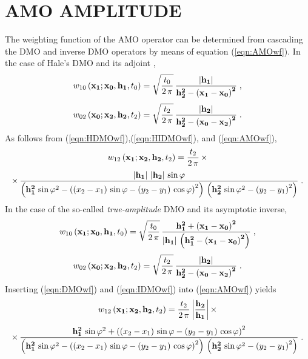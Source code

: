 \section{AMO AMPLITUDE}
The weighting function of the AMO operator can be determined from 
cascading the DMO and inverse DMO operators by means of equation
(\ref{eqn:AMOwf}). In the case of Hale's DMO \cite{Hale} and
its adjoint \cite{GEO52.07.09730984},
\begin{equation}
w_{10}\left({\bf x_1;x_0, h_1},t_0\right) = 
\sqrt{t_0 \over 2\,\pi}\,
{{\bf {\left|h_1\right|} \over {h_2^2-\left(x_1-x_0\right)^2}}}\;,
\label{eqn:HDMOwf}
\end{equation}
\begin{equation}
w_{02}\left({\bf x_0;x_2, h_2},t_2\right)  = 
\sqrt{t_2 \over 2\,\pi}\,
{{\bf {\left|h_2\right|} \over {h_2^2-\left(x_0-x_2\right)^2}}}\;.
\label{eqn:HIDMOwf}
\end{equation}  
As follows from (\ref{eqn:HDMOwf}),(\ref{eqn:HIDMOwf}), and (\ref{eqn:AMOwf}),
\begin{eqnarray*}
w_{12}\left({\bf x_1;x_2, h_2},t_2\right) = {t_2 \over {2\,\pi}}\,
\times
\end{eqnarray*}
\begin{eqnarray}
\times\,
{{{\bf \left|h_1\right|\,\left|h_2\right|}\,\sin{\varphi}}\over
{\left({\bf h_1^2}\,\sin{\varphi}^2-
\left(\left(x_2-x_1\right)\,\sin{\varphi}-
\left(y_2-y_1\right)\,\cos{\varphi}\right)^2\right)\,
\left({\bf h_2^2}\,\sin{\varphi}^2-\left(y_2-y_1\right)^2\right)}}\;.
\label{eqn:HAMOwfdf}
\end{eqnarray}
In the case of the so-called {\em true-amplitude} DMO
\cite{black} and its asymptotic inverse,
\begin{equation}
w_{10}\left({\bf x_1;x_0, h_1},t_0\right)  = 
\sqrt{t_0 \over 2\,\pi}\,
{\bf {h_1^2+\left(x_1-x_0\right)^2} \over
\left|h_1\right|\,\left(h_1^2-\left(x_1-x_0\right)^2\right)}\;,
\label{eqn:DMOwf}
\end{equation}
\begin{equation}
w_{02}\left({\bf x_0;x_2, h_2},t_2\right)  = 
\sqrt{t_2 \over 2\,\pi}\,
{{\bf {\left|h_2\right|} \over {h_2^2-\left(x_0-x_2\right)^2}}}\;.
\label{eqn:IDMOwf}
\end{equation}  
Inserting (\ref{eqn:DMOwf}) and (\ref{eqn:IDMOwf}) into (\ref{eqn:AMOwf}) yields
\begin{eqnarray*}
w_{12}\left({\bf x_1;x_2, h_2},t_2\right) = {t_2 \over {2\,\pi}}\,
{\left|{\bf h_2 \over h_1}\right|}\,\times
\end{eqnarray*}
\begin{eqnarray}
\times\,
{{{\bf h_1^2}\,\sin{\varphi}^2+
\left(\left(x_2-x_1\right)\,\sin{\varphi}-
\left(y_2-y_1\right)\,\cos{\varphi}\right)^2}\over
{\left({\bf h_1^2}\,\sin{\varphi}^2-
\left(\left(x_2-x_1\right)\,\sin{\varphi}-
\left(y_2-y_1\right)\,\cos{\varphi}\right)^2\right)\,
\left({\bf h_2^2}\,\sin{\varphi}^2-\left(y_2-y_1\right)^2\right)}}\;.
\label{eqn:AMOwfdf}
\end{eqnarray}
{}\appendix{}
